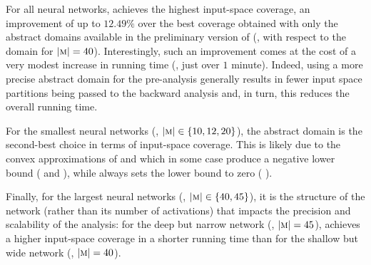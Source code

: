 For all neural networks, \reducedproduct{} achieves the highest input-space coverage, an improvement of up to $12.49\%$ over the best coverage obtained with only the abstract domains available in the preliminary version of \libra{}  (\ie, with respect to the \deeppoly{} domain for $|\textsc{m}| = 40$). Interestingly, such an improvement comes at the cost of a very modest increase in running time (\ie, just over $1$ minute).
Indeed, using a more precise abstract domain for the pre-analysis generally results in fewer input space partitions being passed to the backward analysis and, in turn, this reduces the overall running time.

For the smallest neural networks (\ie, $|\textsc{m}| \in \{10, 12, 20\}$), the \symbolic{} abstract domain is the second-best choice in terms of input-space coverage. This is likely due to the convex \relu{} approximations of \deeppoly{} and \neurify{} which in some case produce a negative lower bound (\cf{}  and ),
while \symbolic{} always sets the lower bound to zero (\cf{} ).

Finally, for the largest neural networks (\ie, $|\textsc{m}| \in \{40, 45\}$), it is the structure of the network (rather than its number of \relu{} activations) that impacts the precision and scalability of the analysis: for the deep but narrow network (\ie, $|\textsc{m}| = 45$), \libra{} achieves a higher input-space coverage in a shorter running time than for the shallow but wide network (\ie, $|\textsc{m}| = 40$). \\
%

